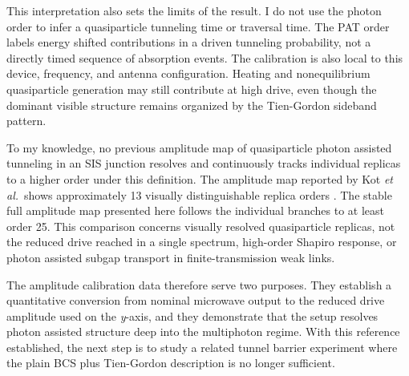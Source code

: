         This interpretation also sets the limits of the result. I do not use the photon order to infer a quasiparticle tunneling time or traversal time. The PAT order labels energy shifted contributions in a driven tunneling probability, not a directly timed sequence of absorption events. The calibration is also local to this device, frequency, and antenna configuration. Heating and nonequilibrium quasiparticle generation may still contribute at high drive, even though the dominant visible structure remains organized by the Tien-Gordon sideband pattern.

        To my knowledge, no previous amplitude map of quasiparticle photon assisted tunneling in an SIS junction resolves and continuously tracks individual replicas to a higher order under this definition. The amplitude map reported by Kot \textit{et al.}~shows approximately 13 visually distinguishable replica orders \cite{kot_microwave-assisted_2020}. The stable full amplitude map presented here follows the individual branches to at least order 25. This comparison concerns visually resolved quasiparticle replicas, not the reduced drive reached in a single spectrum, high-order Shapiro response, or photon assisted subgap transport in finite-transmission weak links.

        The amplitude calibration data therefore serve two purposes. They establish a quantitative conversion from nominal microwave output to the reduced drive amplitude used on the \textit{y}-axis, and they demonstrate that the setup resolves photon assisted structure deep into the multiphoton regime. With this reference established, the next step is to study a related tunnel barrier experiment where the plain BCS plus Tien-Gordon description is no longer sufficient.
